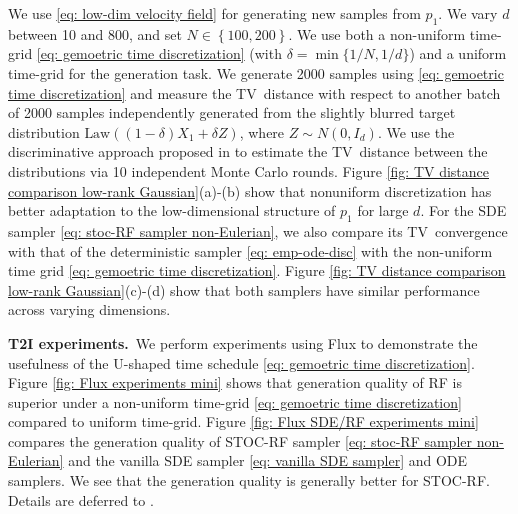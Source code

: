 \documentclass{article}
\theoremstyle{plain}
\theoremstyle{definition}
\theoremstyle{remark}
\def\TV{{\sf TV}}
\newcommand{\bc}[1]{\left\{{#1}\right\}}
\newcommand{\Law}{\text{Law}}
\begin{document}
We use \eqref{eq: low-dim velocity field} for generating new samples from $p_1$. We vary $d$ between 10 and 800, and set $N \in \bc{100, 200}$. We use both a non-uniform time-grid \eqref{eq: gemoetric time discretization} (with $\delta = \min\{1/N, 1/d\}$) and a uniform time-grid for the generation task. We generate 2000 samples using \eqref{eq: gemoetric time discretization} and measure the \TV~distance with respect to another batch of 2000 samples independently generated from the slightly blurred target distribution $\Law((1 - \delta) X_1 + \delta Z)$, where $Z \sim N(0, I_d)$. We use the discriminative approach proposed in \citet{tao2024discriminative} to estimate the \TV~distance between the distributions via 10 independent Monte Carlo rounds. Figure \ref{fig: TV distance comparison low-rank Gaussian}(a)-(b) show that nonuniform discretization has better adaptation to the low-dimensional structure of $p_1$ for large $d$.
For the SDE sampler \eqref{eq: stoc-RF sampler non-Eulerian}, we also compare its \TV~convergence with that of the deterministic sampler \eqref{eq: emp-ode-disc} with the non-uniform time grid \eqref{eq: gemoetric time discretization}. Figure \ref{fig: TV distance comparison low-rank Gaussian}(c)-(d) show that both samplers have similar performance across varying dimensions.

\textbf{T2I experiments.}~We perform experiments using Flux \citep{flux2024, labs2025flux1kontextflowmatching} to demonstrate the usefulness of the U-shaped time schedule \eqref{eq: gemoetric time discretization}. 
Figure \ref{fig: Flux experiments mini} shows that generation quality of RF is superior under a non-uniform time-grid \eqref{eq: gemoetric time discretization} compared to uniform time-grid. Figure \ref{fig: Flux SDE/RF experiments mini} compares the generation quality of STOC-RF sampler \eqref{eq: stoc-RF sampler non-Eulerian} and the vanilla SDE sampler \eqref{eq: vanilla SDE sampler} and ODE samplers. We see that the generation quality is generally better for STOC-RF. Details are deferred to .
\end{document}
